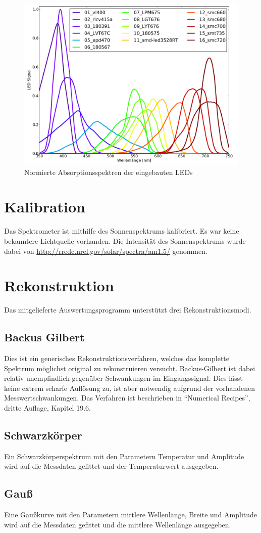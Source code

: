 \documentclass[a4paper, 12pt]{scrartcl}
\begin{document}
\begin{figure}[ht]
\centering
\includegraphics[width=\textwidth]{images/spektren.pdf}
\caption{Normierte Absorptionsspektren der eingebauten LEDs}
\end{figure}


\section{Kalibration}
Das Spektrometer ist mithilfe des Sonnenspektrums kalibriert. Es war keine bekanntere Lichtquelle vorhanden. Die Intensität des Sonnenspektrums wurde dabei von \url{http://rredc.nrel.gov/solar/spectra/am1.5/} genommen.


\section{Rekonstruktion}
Das mitgelieferte Auswertungsprogramm unterstützt drei Rekonstruktionsmodi.

\subsection{Backus Gilbert}
Dies ist ein generisches Rekonstruktionsverfahren, welches das komplette Spektrum möglichst original zu rekonstruieren versucht.
Backus-Gilbert ist dabei relativ unempfindlich gegenüber Schwankungen im Eingangssignal.
Dies lässt keine extrem scharfe Auflösung zu, ist aber notwendig aufgrund der vorhandenen Messwertschwankungen.
Das Verfahren ist beschrieben in "`Numerical Recipes"', dritte Auflage, Kapitel 19.6.

\subsection{Schwarzkörper}
Ein Schwarzkörperspektrum mit den Parametern Temperatur und Amplitude wird auf die Messdaten gefittet und der Temperaturwert ausgegeben.

\subsection{Gauß}
Eine Gaußkurve mit den Parametern mittlere Wellenlänge, Breite und Amplitude wird auf die Messdaten gefittet und die mittlere Wellenlänge ausgegeben.
\end{document}
